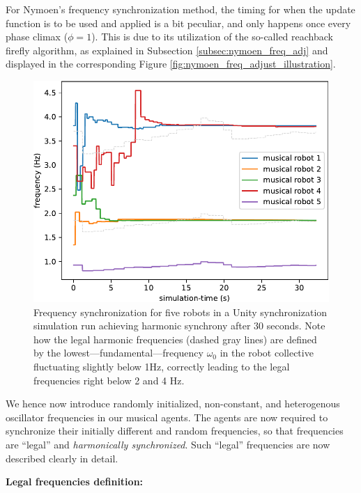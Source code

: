	For Nymoen's frequency synchronization method, the timing for when the update function is to be used and applied is a bit peculiar, and only happens once every phase climax ($\phi=1$). This is due to its utilization of the so-called reachback firefly algorithm, as explained in Subsection \ref{subsec:nymoen_freq_adj} and displayed in the corresponding Figure \ref{fig:nymoen_freq_adjust_illustration}.
	
	\begin{figure}
		\centering
		\includegraphics[width=\linewidth]{Assets/DocSegments/Chapters/ExperimentsAndResults/Figures/Explanations/FrequencySynchronizationPlot.pdf}
		\caption[Simulation run plot: frequency plot.]{Frequency synchronization for five robots in a Unity synchronization simulation run achieving harmonic synchrony after 30 seconds. Note how the legal harmonic frequencies (dashed gray lines) are defined by the lowest—fundamental—frequency $\omega_0$ in the robot collective fluctuating slightly below 1Hz, correctly leading to the legal frequencies right below 2 and 4 Hz.}
		\label{fig:frequency_synch}
	\end{figure}
	
	We hence now introduce randomly initialized, non-constant, and heterogenous oscillator frequencies in our musical agents. The agents are now required to synchronize their initially different and random frequencies, so that frequencies are ``legal'' and \textit{harmonically synchronized}. Such ``legal'' frequencies are now described clearly in detail. \nl
	
	\textbf{Legal frequencies definition:} \nl

